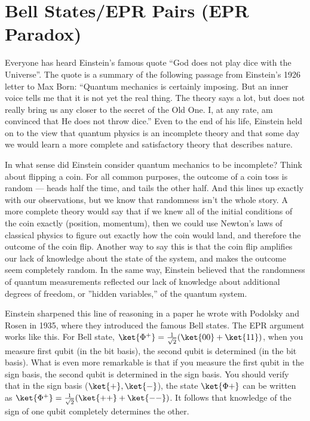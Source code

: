 \documentclass[12pt, oneside]{book}
\theoremstyle{definition}
\theoremstyle{definition}
\theoremstyle{remark}
\begin{document}
\section{Bell States/EPR Pairs (EPR Paradox)}
Everyone has heard Einstein’s famous quote ``God does not play dice with the Universe”. The quote is a summary of the following passage from Einstein’s 1926 letter to Max Born: ``Quantum mechanics is certainly imposing. But an inner voice tells me that it is not yet the real thing. The theory says a lot, but does not really bring us any closer to the secret of the Old One. I, at any rate, am convinced that He does not throw dice.” Even to the end of his life, Einstein held on to the view that quantum physics is an incomplete theory and that some day we would learn a more complete and satisfactory theory that describes nature. 

In what sense did Einstein consider quantum mechanics to be incomplete? Think about flipping a coin. For all common purposes, the outcome of a coin toss is random — heads half the time, and tails the other half. And this lines up exactly with our observations, but we know that randomness isn’t the whole story. A more complete theory would say that if we knew all of the
initial conditions of the coin exactly (position, momentum), then we could use Newton’s laws of classical physics to figure out exactly how the coin would land, and therefore the outcome of the coin flip. Another way to say this is that the coin flip  amplifies our lack of knowledge about the state of the system, and makes the outcome seem completely random. In the same way, Einstein believed that the randomness of quantum measurements reflected our lack of knowledge about additional degrees of freedom, or ”hidden variables,” of the quantum system.

Einstein sharpened this line of reasoning in a paper he wrote with Podolsky and Rosen in 1935, where they introduced the famous Bell states. The EPR argument works like this. For Bell state, $\ket{\Phi^{+}}=\frac{1}{\sqrt{2}}(\ket{00}+\ket{11})$, when you measure first qubit (in the bit basis), the second qubit is determined (in the bit basis). What is even more remarkable is that if you measure the first qubit in the sign basis, the second qubit is determined in the sign basis. You should verify that in the sign basis ($\ket{+},\ket{-}$), the state $\ket{\Phi+}$ can be written as $\ket{\Phi^{+}}=\frac{1}{\sqrt{2}}(\ket{++}+\ket{--})$. It follows that knowledge of the sign of one qubit completely determines the other. 
\end{document}
